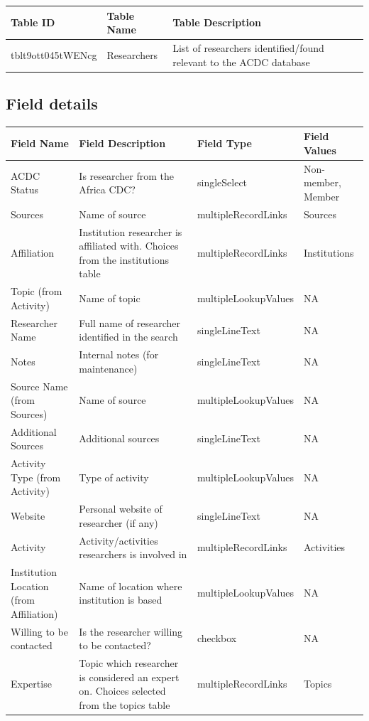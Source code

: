 \documentclass[
]{book}
\begin{document}
\begin{table}
\centering
\begin{tabular}{l|l|l}
\hline
\textbf{Table ID} & \textbf{Table Name} & \textbf{Table Description}\\
\hline
tblt9ott045tWENcg & Researchers & List of researchers identified/found relevant to the ACDC database\\
\hline
\end{tabular}
\end{table}

\hypertarget{field-details-3}{%
\subsection{Field details}\label{field-details-3}}

\begin{table}
\centering
\begin{tabular}{l|l|l|l}
\hline
\textbf{Field Name} & \textbf{Field Description} & \textbf{Field Type} & \textbf{Field Values}\\
\hline
ACDC Status & Is researcher from the Africa CDC? & singleSelect & Non-member, Member\\
\hline
Sources & Name of source & multipleRecordLinks & Sources\\
\hline
Affiliation & Institution researcher is affiliated with. Choices from the institutions table & multipleRecordLinks & Institutions\\
\hline
Topic (from Activity) & Name of topic & multipleLookupValues & NA\\
\hline
Researcher Name & Full name of researcher identified in the search & singleLineText & NA\\
\hline
Notes & Internal notes (for maintenance) & singleLineText & NA\\
\hline
Source Name (from Sources) & Name of source & multipleLookupValues & NA\\
\hline
Additional Sources & Additional sources & singleLineText & NA\\
\hline
Activity Type (from Activity) & Type of activity & multipleLookupValues & NA\\
\hline
Website & Personal website of researcher (if any) & singleLineText & NA\\
\hline
Activity & Activity/activities researchers is involved in & multipleRecordLinks & Activities\\
\hline
Institution Location (from Affiliation) & Name of location where institution is based & multipleLookupValues & NA\\
\hline
Willing to be contacted & Is the researcher willing to be contacted? & checkbox & NA\\
\hline
Expertise & Topic which researcher is considered an expert on. Choices selected from the topics table & multipleRecordLinks & Topics\\
\hline
\end{tabular}
\end{table}
\end{document}
